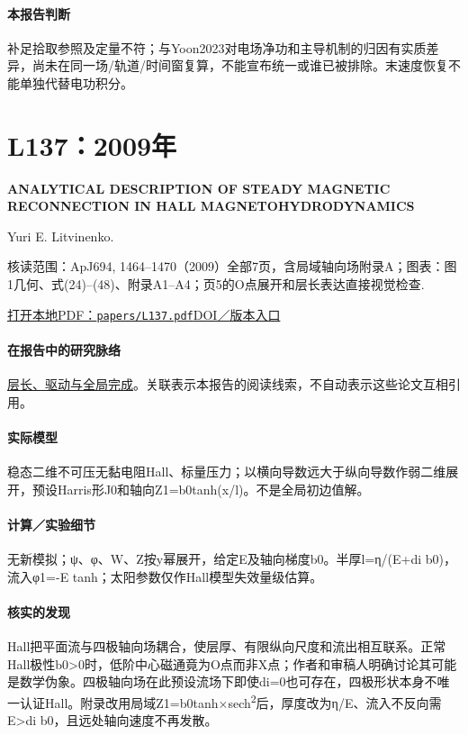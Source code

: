 \paragraph{本报告判断}补足拾取参照及定量不符；与Yoon2023对电场净功和主导机制的归因有实质差异，尚未在同一场/轨道/时间窗复算，不能宣布统一或谁已被排除。末速度恢复不能单独代替电功积分。

\section{L137：2009年}\label{paper:L137}

\textbf{ANALYTICAL DESCRIPTION OF STEADY MAGNETIC RECONNECTION IN HALL MAGNETOHYDRODYNAMICS}\citep{L137}\

Yuri E. Litvinenko.

\textsf{核读范围：}ApJ694, 1464–1470（2009）全部7页，含局域轴向场附录A；\textsf{图表：}图1几何、式(24)–(48)、附录A1–A4；页5的O点展开和层长表达直接视觉检查.

\href{run:papers/L137.pdf}{打开本地PDF：\texttt{papers/L137.pdf}}\quad\href{https://doi.org/10.1088/0004-637x/694/2/1464}{DOI／版本入口}

\paragraph{在报告中的研究脉络}\hyperref[story:global]{层长、驱动与全局完成}。关联表示本报告的阅读线索，不自动表示这些论文互相引用。

\paragraph{实际模型}稳态二维不可压无黏电阻Hall、标量压力；以横向导数远大于纵向导数作弱二维展开，预设Harris形J0和轴向Z1=b0tanh(x/l)。不是全局初边值解。

\paragraph{计算／实验细节}无新模拟；ψ、φ、W、Z按y幂展开，给定E及轴向梯度b0。半厚l=η/(E+di b0)，流入φ1=-E tanh；太阳参数仅作Hall模型失效量级估算。

\paragraph{核实的发现}Hall把平面流与四极轴向场耦合，使层厚、有限纵向尺度和流出相互联系。正常Hall极性b0>0时，低阶中心磁通竟为O点而非X点；作者和审稿人明确讨论其可能是数学伪象。四极轴向场在此预设流场下即使di=0也可存在，四极形状本身不唯一认证Hall。附录改用局域Z1=b0tanh×sech\textsuperscript{2}后，厚度改为η/E、流入不反向需E>di b0，且远处轴向速度不再发散。

